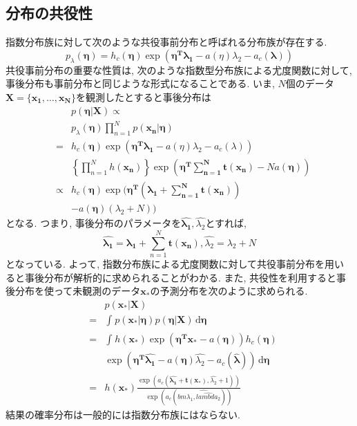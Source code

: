 \documentclass[twocolumn]{jarticle}
\begin{document}
\subsection{分布の共役性}
指数分布族に対して次のような共役事前分布と呼ばれる分布族が存在する.
\begin{equation}
  p_{\lambda}(\bm {\eta}) = h_c(\bm {\eta}) \exp(\bm {\eta^T \lambda_1} - a(\eta)\lambda_2 - a_c(\bm {\lambda}))
\end{equation}
共役事前分布の重要な性質は, 次のような指数型分布族による尤度関数に対して, 事後分布も事前分布と同じような形式になることである. いま, ${N}$個のデータ${\bm {X} = \{\bm {x_1}, \ldots, \bm {x_N}\}}$を観測したとすると事後分布は
\begin{eqnarray}
  &&p(\bm {\eta | X}) \varpropto \nonumber \\
  &&p_\lambda(\bm {\eta})\prod_{n=1}^{N}p(\bm {x_n|\eta}) \nonumber \\
  &=& h_c (\bm {\eta})\exp(\bm {\eta^T\lambda_1} - a(\eta)\lambda_2 - a_c(\lambda)) \nonumber \\
  && \left\{\prod_{n=1}^{N} h(\bm {x_n})\right\} \exp\left(\bm {\eta^T \sum_{n=1}^{N}}\bm {t(x_n)} - Na(\bm {\eta})\right) \nonumber \\
  &\varpropto & h_c(\bm {\eta}) \exp(\bm {\eta^T}  (\bm {\lambda_1 + \sum_{n=1}^{N}\bm{t(x_n)}}) \nonumber \\
  && - a(\bm {\eta})(\lambda_2 + N))
\end{eqnarray}
となる. つまり, 事後分布のパラメータを${\bm {\hat{\lambda_1}}, \hat{\lambda_2}}$とすれば,
\begin{equation}
  \bm {\hat{\lambda_1}} = \bm {\lambda_1} + \sum_{n=1}^{N} \bm{t(x_n)}, \hat{\lambda_2} = \lambda_2 + N
\end{equation}
となっている. よって, 指数分布族による尤度関数に対して共役事前分布を用いると事後分布が解析的に求められることがわかる.
また, 共役性を利用すると事後分布を使って未観測のデータ${\bm {x_\ast }}$の予測分布を次のように求められる.
\begin{eqnarray}
  && p(\bm {x_\ast|X}) \nonumber \\
  &=& \int_{}^{} p(\bm {x_\ast| \eta})p(\bm {\eta|X}) \,\mathrm{d}{\bm {\eta}} \nonumber \\
  &=& \int_{}^{} h(\bm {x_\ast}) \exp(\bm {\eta^T x_\ast} - a(\bm {\eta}))h_c(\bm {\eta}) \nonumber \\
  && \exp(\bm {\eta^T \hat{\lambda_1}} - a(\bm {\eta}) \hat{\lambda_2} - a_c(\bm {\hat{\lambda}})) \,\mathrm{d}{\bm {\eta}} \nonumber \\
  &=& h(\bm {x_\ast}) \frac{\exp(a_c(\bm {\hat{\lambda_1}} + \bm {t(x_\ast)}, \hat{\lambda_2} + 1))}{\exp(a_c(bm{\hat{\lambda_1, \hat{lambda_2}}}))}
\end{eqnarray}
結果の確率分布は一般的には指数分布族にはならない.
\end{document}
